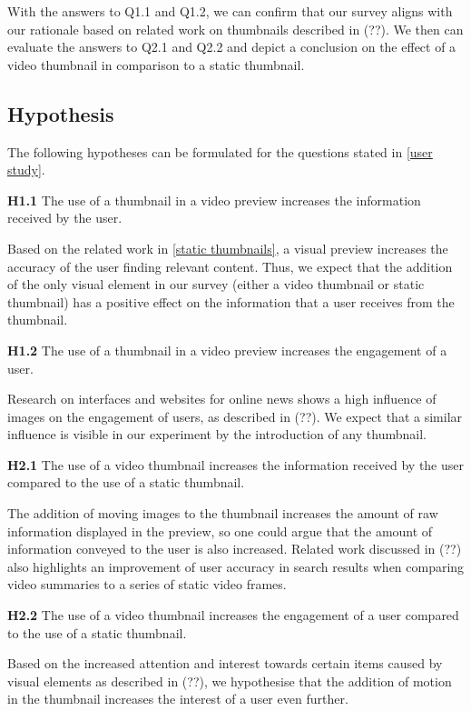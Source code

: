 \documentclass{../resources/sig-alternate-05-2015}
\begin{document}
With the answers to Q1.1 and Q1.2, we can confirm that our survey aligns with our rationale based on related work on thumbnails described in (??). We then can evaluate the answers to Q2.1 and Q2.2 and depict a conclusion on the effect of a video thumbnail in comparison to a static thumbnail.

\subsection{Hypothesis}

The following hypotheses can be formulated for the questions stated in \ref{user study}.

\textbf{H1.1} The use of a thumbnail in a video preview increases the information received by the user.

Based on the related work in \ref{static thumbnails}, a visual preview increases the accuracy of the user finding relevant content. Thus, we expect that the addition of the only visual element in our survey (either a video thumbnail or static thumbnail) has a positive effect on the information that a user receives from the thumbnail.

\textbf{H1.2} The use of a thumbnail in a video preview increases the engagement of a user.

Research on interfaces and websites for online news shows a high influence of images on the engagement of users, as described in (??). We expect that a similar influence is visible in our experiment by the introduction of any thumbnail.

\textbf{H2.1} The use of a video thumbnail increases the information received by the user compared to the use of a static thumbnail.

The addition of moving images to the thumbnail increases the amount of raw information displayed in the preview, so one could argue that the amount of information conveyed to the user is also increased. Related work discussed in (??) also highlights an improvement of user accuracy in search results when comparing video summaries to a series of static video frames.

\textbf{H2.2} The use of a video thumbnail increases the engagement of a user compared to the use of a static thumbnail.

Based on the increased attention and interest towards certain items caused by visual elements as described in (??), we hypothesise that the addition of motion in the thumbnail increases the interest of a user even further.
\end{document}
